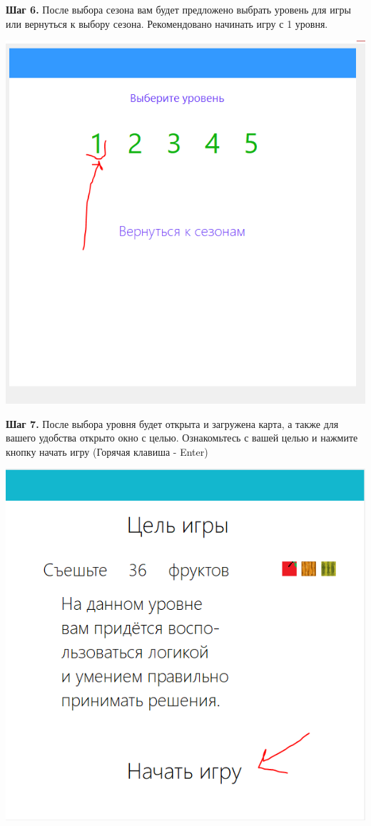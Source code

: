 \documentclass[a4paper,14pt]{extarticle}
\begin{document}
\textbf{Шаг 6.} После выбора сезона вам будет предложено выбрать уровень для игры или вернуться к выбору сезона. Рекомендовано начинать игру с 1 уровня.
\begin{center}
\includegraphics[scale=.9]{img6}
\end{center} 

\textbf{Шаг 7.} После выбора уровня будет открыта и загружена карта, а также для вашего удобства открыто окно с целью. Ознакомьтесь с вашей целью и нажмите кнопку начать игру (Горячая клавиша - Enter)
\begin{center}
\includegraphics[scale=.9]{img7}
\end{center}
\end{document}
